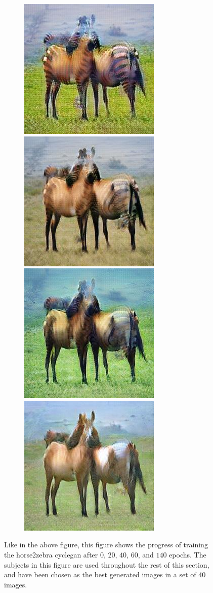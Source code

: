 \documentclass[12pt, fleqn, titlepage]{article}
\newcommand\skipperer{0.45pt}
\newcommand{\1}[1]{\mathds{1}\left[#1\right]}
\begin{document}
\begin{figure}[H]
\begin{subfigure}[b]{0.8\textwidth}
		\hskip\skipperer
		\includegraphics[width=0.15\linewidth]{imgs/horse2zebra_cycle/gaussnoise/progress/51_20_fake_a}
		\hskip\skipperer
		\includegraphics[width=0.15\linewidth]{imgs/horse2zebra_cycle/gaussnoise/progress/51_40_fake_a}
		\hskip\skipperer
		\includegraphics[width=0.15\linewidth]{imgs/horse2zebra_cycle/gaussnoise/progress/51_60_fake_a}
		\hskip\skipperer
		\includegraphics[width=0.15\linewidth]{imgs/horse2zebra_cycle/gaussnoise/progress/51_140_fake_a}
	\end{subfigure}
	\caption{Like in the above figure, this figure shows the progress of training the horse2zebra cyclegan after $0$, $20$, $40$, $60$, and $140$ epochs. The subjects in this figure are used throughout the rest of this section, and have been chosen as the best generated images in a set of 40 images.}
	\label{fig:horse2zebra_progress_zebra}
\end{figure}
\end{document}
